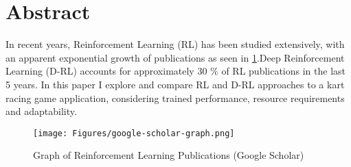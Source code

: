 
\chapter*{Abstract}
In recent years, Reinforcement Learning (RL) has been studied extensively, with an apparent exponential growth of publications as seen in \ref{fig:rl-papers-graph}.Deep Reinforcement Learning (D-RL) accounts for approximately 30 \% of RL publications in the last 5 years. In this paper I explore and compare RL and D-RL approaches to a kart racing game application, considering trained performance, resource requirements and adaptability.
\begin{figure}[b]
    \centering
    \texttt{[image: Figures/google-scholar-graph.png]}
    \caption{Graph of Reinforcement Learning Publications (Google Scholar)}
    \label{fig:rl-papers-graph}
\end{figure}